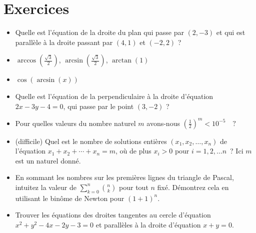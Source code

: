 \section{Exercices}
\begin{frame} %
\begin{itemize}
\item Quelle est l'équation de la droite du plan qui passe par $(2,-3)$ et qui 
est parall\`ele \`a la droite passant par $(4,1)$ et $(-2,2)$ ?
\item \(\arccos(\frac{\sqrt{3}}{2})\), \(\arcsin(\frac{\sqrt{3}}{2})\), \(\arctan(1)\)
\item \(\cos(\arcsin(x))\)
\item Quelle est l'équation de la perpendiculaire \`a la droite d'équation 
$2x-3y-4=0$, qui passe par le point $(3,-2)$ ?
\item Pour quelles valeurs du nombre naturel $m$ avons-nous
$
\left(\frac{1}{2}\right)^m < 10^{-5} \quad ?
$
\item (difficile) Quel est le nombre de solutions enti\`eres $(x_1,x_2,\ldots, x_n)$ de l'équation $x_1+x_2+\cdots +x_n=m$, o\`u de plus $x_i>0$ pour $i=1,2,\ldots n$~?
Ici $m$ est un naturel donné.
\item En sommant les nombres sur les premières lignes du triangle de Pascal, intuitez la valeur de \(\sum_{k=0}^{n} \binom{n}{k}\) pour tout \(n\) fixé. Démontrez cela en utilisant le binôme de Newton pour \((1+1)^n\).
\item Trouver les équations des droites tangentes au cercle d'équation 
$x^2+y^2-4x-2y-3=0$ et parall\`eles \`a la droite d'équation $x+y=0$.
\end{itemize}
\end{frame}
